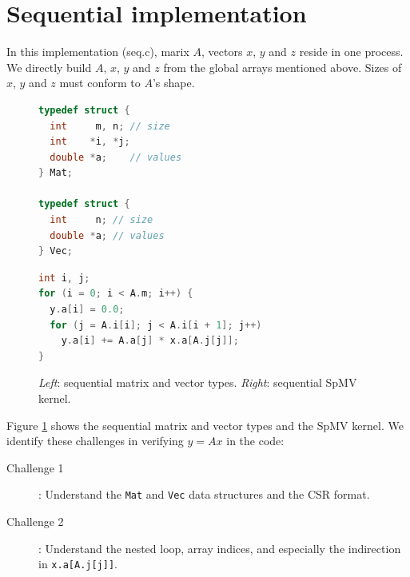 \documentclass[submission]{eptcs}
\begin{document}
\section{Sequential implementation}
\label{sec:seq}
In this implementation (seq.c), marix $A$, vectors $x$, $y$ and $z$ reside in one process.
We directly build $A$, $x$, $y$ and $z$ from the global arrays mentioned above.
Sizes of $x$, $y$ and $z$ must conform to $A$'s shape.
\vspace{-10pt}
\begin{figure}[h]
\begin{minipage}{0.35\textwidth}
\begin{lstlisting}[language=C]
typedef struct {
  int     m, n; // size
  int    *i, *j;
  double *a;    // values
} Mat;

typedef struct {
  int     n; // size
  double *a; // values
} Vec;
\end{lstlisting}
\end{minipage}
\hfill
\begin{minipage}{0.55\textwidth}
  \begin{lstlisting}[language=C]
int i, j;
for (i = 0; i < A.m; i++) {
  y.a[i] = 0.0;
  for (j = A.i[i]; j < A.i[i + 1]; j++)
    y.a[i] += A.a[j] * x.a[A.j[j]];
}
\end{lstlisting}
\end{minipage}
\vspace{-10pt}
\caption{{\it Left}: sequential matrix and vector types. {\it Right}: sequential SpMV kernel.}
\label{fig:seqcsr}
\vspace{-5pt}
\end{figure}

Figure \ref{fig:seqcsr} shows the sequential matrix and vector types and the SpMV kernel.
We identify these challenges in verifying $y=Ax$ in the code:
\begin{description}
  \item [Challenge 1]: Understand the {\tt Mat} and {\tt Vec} data structures and the CSR format.
  \item [Challenge 2]: Understand the nested loop, array indices, and especially the indirection in {\tt x.a[A.j[j]]}.
\end{description}
\end{document}
